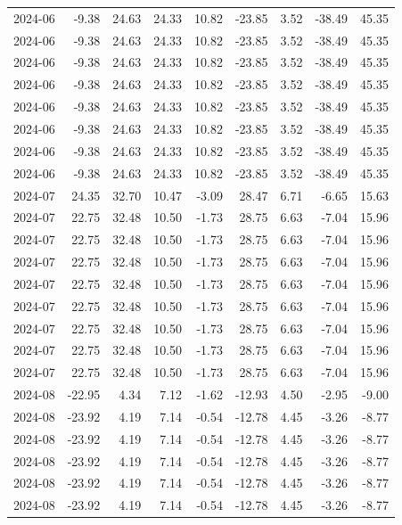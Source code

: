 \begin{table}[ht]
\begin{tabular}{lrrrrrrrr}
  2024-06 & -9.38 & 24.63 & 24.33 & 10.82 & -23.85 & 3.52 & -38.49 & 45.35 \\ 
  2024-06 & -9.38 & 24.63 & 24.33 & 10.82 & -23.85 & 3.52 & -38.49 & 45.35 \\ 
  2024-06 & -9.38 & 24.63 & 24.33 & 10.82 & -23.85 & 3.52 & -38.49 & 45.35 \\ 
  2024-06 & -9.38 & 24.63 & 24.33 & 10.82 & -23.85 & 3.52 & -38.49 & 45.35 \\ 
  2024-06 & -9.38 & 24.63 & 24.33 & 10.82 & -23.85 & 3.52 & -38.49 & 45.35 \\ 
  2024-06 & -9.38 & 24.63 & 24.33 & 10.82 & -23.85 & 3.52 & -38.49 & 45.35 \\ 
  2024-06 & -9.38 & 24.63 & 24.33 & 10.82 & -23.85 & 3.52 & -38.49 & 45.35 \\ 
  2024-06 & -9.38 & 24.63 & 24.33 & 10.82 & -23.85 & 3.52 & -38.49 & 45.35 \\ 
  2024-07 & 24.35 & 32.70 & 10.47 & -3.09 & 28.47 & 6.71 & -6.65 & 15.63 \\ 
  2024-07 & 22.75 & 32.48 & 10.50 & -1.73 & 28.75 & 6.63 & -7.04 & 15.96 \\ 
  2024-07 & 22.75 & 32.48 & 10.50 & -1.73 & 28.75 & 6.63 & -7.04 & 15.96 \\ 
  2024-07 & 22.75 & 32.48 & 10.50 & -1.73 & 28.75 & 6.63 & -7.04 & 15.96 \\ 
  2024-07 & 22.75 & 32.48 & 10.50 & -1.73 & 28.75 & 6.63 & -7.04 & 15.96 \\ 
  2024-07 & 22.75 & 32.48 & 10.50 & -1.73 & 28.75 & 6.63 & -7.04 & 15.96 \\ 
  2024-07 & 22.75 & 32.48 & 10.50 & -1.73 & 28.75 & 6.63 & -7.04 & 15.96 \\ 
  2024-07 & 22.75 & 32.48 & 10.50 & -1.73 & 28.75 & 6.63 & -7.04 & 15.96 \\ 
  2024-07 & 22.75 & 32.48 & 10.50 & -1.73 & 28.75 & 6.63 & -7.04 & 15.96 \\ 
  2024-08 & -22.95 & 4.34 & 7.12 & -1.62 & -12.93 & 4.50 & -2.95 & -9.00 \\ 
  2024-08 & -23.92 & 4.19 & 7.14 & -0.54 & -12.78 & 4.45 & -3.26 & -8.77 \\ 
  2024-08 & -23.92 & 4.19 & 7.14 & -0.54 & -12.78 & 4.45 & -3.26 & -8.77 \\ 
  2024-08 & -23.92 & 4.19 & 7.14 & -0.54 & -12.78 & 4.45 & -3.26 & -8.77 \\ 
  2024-08 & -23.92 & 4.19 & 7.14 & -0.54 & -12.78 & 4.45 & -3.26 & -8.77 \\ 
  2024-08 & -23.92 & 4.19 & 7.14 & -0.54 & -12.78 & 4.45 & -3.26 & -8.77 \\ 

\end{tabular}
\end{table}
